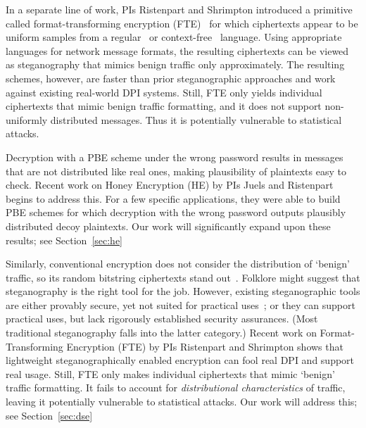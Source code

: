 {{In a separate line of work, PIs Ristenpart and Shrimpton introduced a primitive
called format-transforming encryption (FTE)~\cite{Dyer-2013} for which
ciphertexts appear to be
uniform samples from a regular~\cite{Dyer-2013,luchaup2014libfte} 
or context-free~\cite{luchaup2014formatted} language.
Using appropriate languages for network message formats, the resulting
ciphertexts can be viewed as steganography that mimics 
benign traffic only approximately. The resulting 
schemes, however, are faster than prior steganographic approaches and work against
existing real-world DPI systems. Still, FTE only yields {individual} ciphertexts that
mimic benign traffic formatting, and it does not support non-uniformly 
distributed messages. Thus it is potentially
vulnerable to statistical attacks.  
 
\iffalse
Decryption with a PBE scheme under the wrong password results in
messages that are not distributed like real ones, making plausibility
of plaintexts easy to check.  Recent work on Honey Encryption (HE) by PIs Juels and
Ristenpart begins to address this.  For a few specific applications,
they were able to build PBE schemes for which decryption with the wrong
password outputs plausibly distributed decoy plaintexts. 
Our work will significantly expand upon these results; see Section~\ref{sec:he}

Similarly, conventional encryption does not consider the distribution
of `benign' traffic, so its random bitstring ciphertexts stand
out~\cite{KBMP13}.  Folklore might suggest that steganography 
is the right tool for the job.  However, existing
steganographic tools are either provably secure, yet not suited for
practical uses~\cite{Hopper:Provable_Stego}; or they can support
practical uses, but lack rigorously established security
assurances. (Most traditional steganography falls into the latter category.)
Recent work on Format-Transforming Encryption (FTE) by PIs Ristenpart
and Shrimpton shows that lightweight steganographically enabled
encryption can fool real DPI and support real usage.  Still, FTE only makes
{individual} ciphertexts that mimic `benign' traffic formatting.  
It fails to account for \textit{distributional characteristics} of
traffic, leaving it potentially vulnerable to statistical attacks.  
Our work will address this; see Section~\ref{sec:dse}


}}
